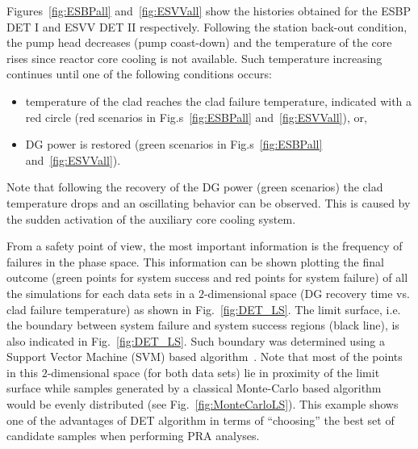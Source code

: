 Figures~\ref{fig:ESBPall} and~\ref{fig:ESVVall} show the histories obtained for the ESBP DET I and ESVV DET II respectively.
Following the station back-out condition, the pump head decreases (pump coast-down) and the temperature of the core rises since reactor core cooling is not available. Such temperature increasing continues until one of the following conditions occurs:
\vspace{-5mm}
\begin{itemize}
\item temperature of the clad reaches the clad failure temperature, indicated with a red circle (red scenarios in Fig.s~\ref{fig:ESBPall} and~\ref{fig:ESVVall}), or,
\item DG power is restored (green scenarios in Fig.s~\ref{fig:ESBPall} and~\ref{fig:ESVVall}).
\end{itemize}
\vspace{-5mm}
Note that following the recovery of the DG power (green scenarios) the clad temperature drops  and an oscillating behavior can be observed.
This is caused by the sudden activation of the auxiliary core cooling system.

From a safety point of view, the most important information is the frequency of failures in the phase space. This information can be shown plotting the final outcome (green points for system success and red points for system failure) of all the simulations for each data sets in a $2$-dimensional space (DG recovery time vs. clad failure temperature) as shown in Fig.~\ref{fig:DET_LS}.
The limit surface, i.e. the boundary between system failure and system success regions (black line), is also indicated in Fig.~\ref{fig:DET_LS}. Such boundary was determined using a Support Vector Machine (SVM) based algorithm~\cite{mandelliSVMANS}.
Note that most of the points in this $2$-dimensional space (for both data sets) lie in proximity  of the limit surface while samples generated by a classical Monte-Carlo based algorithm would be evenly distributed (see Fig.~\ref{fig:MonteCarloLS}). 
This example shows one of the advantages of DET algorithm in terms of ``choosing'' the best set of candidate samples when performing PRA analyses.


